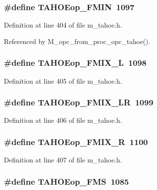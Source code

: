 \subsubsection{\setlength{\rightskip}{0pt plus 5cm}\#define TAHOEop\_\-FMIN~1097}\label{m__tahoe_8h_ef10984e8645c94a92e1a7b07eca027a}




Definition at line 404 of file m\_\-tahoe.h.

Referenced by M\_\-opc\_\-from\_\-proc\_\-opc\_\-tahoe().
\subsubsection{\setlength{\rightskip}{0pt plus 5cm}\#define TAHOEop\_\-FMIX\_\-L~1098}\label{m__tahoe_8h_62b714edb4cbb908ee23fe98528910ee}




Definition at line 405 of file m\_\-tahoe.h.
\subsubsection{\setlength{\rightskip}{0pt plus 5cm}\#define TAHOEop\_\-FMIX\_\-LR~1099}\label{m__tahoe_8h_2c58b74a76e40ecf961890914cd07e1a}




Definition at line 406 of file m\_\-tahoe.h.
\subsubsection{\setlength{\rightskip}{0pt plus 5cm}\#define TAHOEop\_\-FMIX\_\-R~1100}\label{m__tahoe_8h_fb647d337308b199db49183217394f00}




Definition at line 407 of file m\_\-tahoe.h.
\subsubsection{\setlength{\rightskip}{0pt plus 5cm}\#define TAHOEop\_\-FMS~1085}\label{m__tahoe_8h_4db62b89ad86e5354ee65103308a0e3f}





